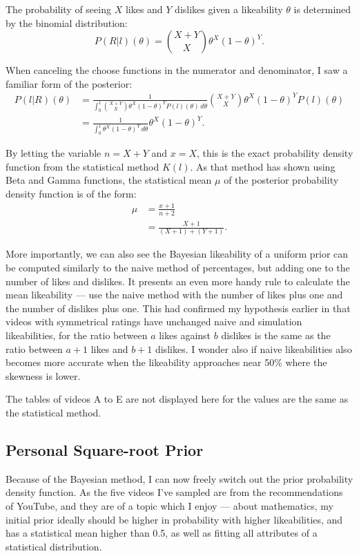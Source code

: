 \documentclass[a4paper,11pt]{article}
\begin{document}
The probability of seeing $X$ likes and $Y$ dislikes given a likeability $\theta$ is determined by the binomial distribution:
\[
    P(R|l)(\theta) = {X+Y \choose X} \theta^X (1-\theta)^Y.
\]

When canceling the choose functions in the numerator and denominator, I saw a familiar form of the posterior:
\begin{align*}
    P(l|R)(\theta) &= \frac{1}{\int_0^1 {X+Y \choose X} \theta^X (1-\theta)^Y P(l)(\theta)\,d\theta}{X+Y \choose X} \theta^X (1-\theta)^Y P(l)(\theta)\\
    &= \frac{1}{\int_0^1 \theta^X (1-\theta)^Y \,d\theta} \theta^X (1-\theta)^Y.
\end{align*}

By letting the variable $n=X+Y$ and $x=X$, this is the exact probability density function from the statistical method $K(l)$. As that method has shown using Beta and Gamma functions, the statistical mean $\mu$ of the posterior probability density function is of the form:
\begin{align*}
    \mu &= \frac{x+1}{n+2}\\
    &= \frac{X+1}{(X+1) + (Y+1)}.
\end{align*}

More importantly, we can also see the Bayesian likeability of a uniform prior can be computed similarly to the naive method of percentages, but adding one to the number of likes and dislikes. It presents an even more handy rule to calculate the mean likeability --- use the naive method with the number of likes plus one and the number of dislikes plus one. This had confirmed my hypothesis earlier in that videos with symmetrical ratings have unchanged naive and simulation likeabilities, for the ratio between $a$ likes against $b$ dislikes is the same as the ratio between $a+1$ likes and $b+1$ dislikes. I wonder also if naive likeabilities also becomes more accurate when the likeability approaches near 50\% where the skewness is lower.

The tables of videos A to E are not displayed here for the values are the same as the statistical method.

\subsection{Personal Square-root Prior}
Because of the Bayesian method, I can now freely switch out the prior probability density function. As the five videos I've sampled are from the recommendations of YouTube, and they are of a topic which I enjoy --- about mathematics, my initial prior ideally should be higher in probability with higher likeabilities, and has a statistical mean higher than 0.5, as well as fitting all attributes of a statistical distribution.
\end{document}
